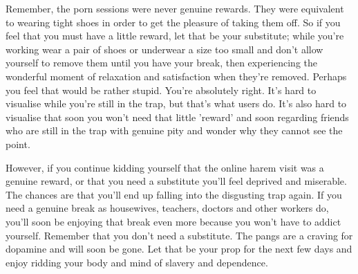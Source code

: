\documentclass[easypeasy.tex]{subfiles}
\begin{document}
Remember, the porn sessions were never genuine rewards. They were equivalent to wearing tight shoes in order to get the pleasure of taking them off. So if you feel that you must have a little reward, let that be your substitute; while you're working wear a pair of shoes or underwear a size too small and don't allow yourself to remove them until you have your break, then experiencing the wonderful moment of relaxation and satisfaction when they're removed. Perhaps you feel that would be rather stupid. You're absolutely right. It's hard to visualise while you're still in the trap, but that's what users do. It's also hard to visualise that soon you won't need that little 'reward' and soon regarding friends who are still in the trap with genuine pity and wonder why they cannot see the point.

However, if you continue kidding yourself that the online harem visit was a genuine reward, or that you need a substitute you'll feel deprived and miserable. The chances are that you'll end up falling into the disgusting trap again. If you need a genuine break as housewives, teachers, doctors and other workers do, you'll soon be enjoying that break even more because you won't have to addict yourself. Remember that you don't need a substitute. The pangs are a craving for dopamine and will soon be gone. Let that be your prop for the next few days and enjoy ridding your body and mind of slavery and dependence.
\end{document}
